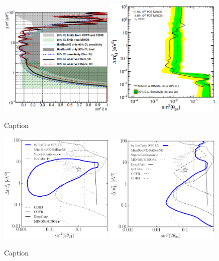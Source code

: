 \begin{figure}
    \centering
    \includegraphics[width = 0.49\textwidth, height = 0.49\textwidth]{figures-chap6/external_limits/numu_disapp_MiniBooNE_SciBooNE.png}
    \includegraphics[width = 0.49\textwidth, height = 0.49\textwidth]{figures-chap6/external_limits/numu_disapp_Minos.png}
    \caption{Caption}
    \label{fig:my_label}
\end{figure}

\begin{figure}
    \centering
    \includegraphics[width = 0.49\textwidth]{figures-chap6/external_limits/numu_disapp_icecube_90pct.png}
    \includegraphics[width = 0.49\textwidth]{figures-chap6/external_limits/numu_disapp_icecube_99pct.png}
    \caption{Caption}
    \label{fig:my_label}
\end{figure}


